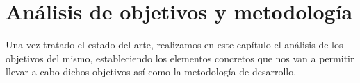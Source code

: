 
\lstset{frame=single,basicstyle=\ttfamily\small}

\chapter{Análisis de objetivos y metodología}

Una vez tratado el estado del arte, realizamos en este capítulo el análisis de los objetivos del mismo, estableciendo los elementos concretos que nos van a permitir llevar a cabo dichos objetivos así como la metodología de desarrollo. 

